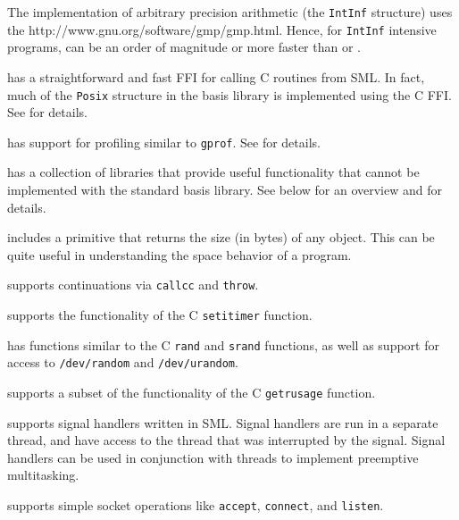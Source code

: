 \begin{description}
The {\mlton} implementation of arbitrary precision arithmetic (the
{\tt IntInf} structure) uses the
		  {http://www.gnu.org/software/gmp/gmp.html}.
Hence, for {\tt IntInf} intensive programs, {\mlton} can be an order
of magnitude or more faster than {\poly} or {\smlnj}.

{\mlton} has a straightforward and fast FFI for calling C routines
from SML.  In fact, much of the {\tt Posix} structure in the basis library is
implemented using the C FFI.
See  for details.

{\mlton} has support for profiling similar to {\tt gprof}.  See
 for details.

{\mlton} has a collection of libraries that provide useful functionality that
cannot be implemented with the standard basis library.  See below for an
overview and  for details.

\begin{description}

{\mlton} includes a primitive that returns the size (in bytes) of any
object.  This can be quite useful in understanding the space behavior
of a program.

{\mlton} supports continuations via {\tt callcc} and {\tt throw}.

{\mlton} supports the functionality of the C {\tt setitimer} function.

{\mlton} has functions similar to the C {\tt rand} and {\tt srand} functions, as
well as support for access to {\tt /dev/random} and {\tt /dev/urandom}.

{\mlton} supports a subset of the functionality of the C {\tt getrusage}
function.

{\mlton} supports signal handlers written in SML.  Signal handlers are 
run in a separate thread, and have access to the thread that was
interrupted by the signal.  Signal handlers can be used in conjunction with
threads to implement preemptive multitasking.

{\mlton} supports simple socket operations like {\tt accept}, 
{\tt connect}, and {\tt listen}.


\end{description}
\end{description}
